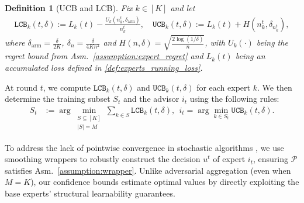 \documentclass[a4paper,14pt]{extarticle}
\theoremstyle{plain}
\newtheorem{definition}{Definition}
\newcommand{\LCB}{\texttt{LCB}}
\newcommand{\UCB}{\texttt{UCB}}
\begin{document}
\begin{definition}[UCB and LCB]
\label{def:ucb_lcb}
Fix $k\in[K]$ and let
\begin{align*}
\LCB_k(t,\delta)
:= L_{k}(t)- \tfrac{U_k\left(n^t_k,\delta_{\mathrm{arm}}\right)}{n^t_k}, \quad
\UCB_k(t,\delta)
:= L_{k}(t) + H(n^t_k,\delta_{n^t_k}),
\end{align*}
where $\delta_{\mathrm{arm}} = \tfrac{\delta}{2K}$,  $\delta_n = \tfrac{\delta}{4Kn^2}$ and $H(n,\delta) = \sqrt{\tfrac{2\log(1/\delta)}{n}}$,
with $U_k(\cdot)$ being the regret bound from Asm.~\ref{assumption:expert_regret} and $L_k(t)$ being an accumulated loss defined in \eqref{def:experts_running_loss}.
\end{definition}

At round $t$, we compute $\LCB_k(t,\delta)$ and $\UCB_k(t,\delta)$ for each expert $k$. We then determine the training subset $S_t$ and the advisor $i_t$ using the following rules:
\begin{align*}
S_t &:= \arg\min_{\substack{S\subseteq[K]\\ |S|=M}} \sum_{k\in S}\LCB_k(t,\delta), ~~
i_t = \arg\min_{k\in S_t}\UCB_k(t,\delta).
\end{align*}

To address the lack of pointwise convergence in stochastic algorithms \cite{cesa2006prediction, shalev2012online, pacchiano2020model}, we use smoothing wrappers \cite{orabona2019modern, pacchiano2020model} to robustly construct the decision $u^t$ of expert $i_t$, ensuring $\mathcal{P}$ satisfies Asm.~\ref{assumption:wrapper}. Unlike adversarial aggregation (even when $M=K$), our confidence bounds estimate optimal values by directly exploiting the base experts' structural learnability guarantees.

\end{document}
